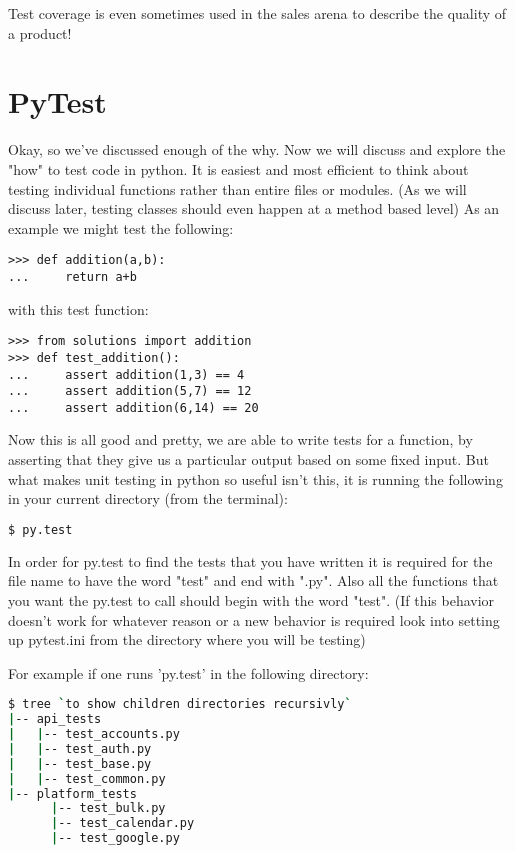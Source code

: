 Test coverage is even sometimes used in the sales arena to describe the quality of a product!

\section*{PyTest}

Okay, so we've discussed enough of the why. Now we will discuss and explore the "how" to test code in python.
It is easiest and most efficient to think about testing individual functions rather than entire files or modules.
(As we will discuss later, testing classes should even happen at a method based level)
As an example we might test the following:
\begin{lstlisting}
>>> def addition(a,b):
...     return a+b
\end{lstlisting}
with this test function:
\begin{lstlisting}
>>> from solutions import addition
>>> def test_addition():
...     assert addition(1,3) == 4
...     assert addition(5,7) == 12
...     assert addition(6,14) == 20
\end{lstlisting}

Now this is all good and pretty, we are able to write tests for a function, by asserting that they give us a particular output based on some fixed input.
But what makes unit testing in python so useful isn't this, it is running the following in your current directory (from the terminal):
\begin{lstlisting}[language=bash]
$ py.test
\end{lstlisting}

\begin{info}
In order for py.test to find the tests that you have written it is required for the file name to have the word "test" and end with ".py".
Also all the functions that you want the py.test to call should begin with the word "test".
(If this behavior doesn't work for whatever reason or a new behavior is required look into setting up pytest.ini from the directory where you will be testing)\\
\end{info}

For example if one runs 'py.test' in the following directory:
\begin{lstlisting}[language=bash]
$ tree `to show children directories recursivly`
|-- api_tests
|   |-- test_accounts.py
|   |-- test_auth.py
|   |-- test_base.py
|   |-- test_common.py
|-- platform_tests
      |-- test_bulk.py
      |-- test_calendar.py
      |-- test_google.py
\end{lstlisting}

